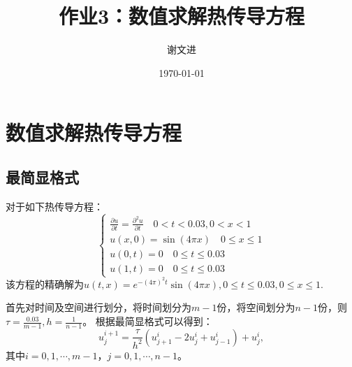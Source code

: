 \documentclass{ctexart}
\title{作业3：数值求解热传导方程}
\author{谢文进}
\date{\today}
\begin{document}
\maketitle
\section{数值求解热传导方程}
\subsection{最简显格式}
对于如下热传导方程：
\begin{equation}
    \begin{cases}
        \frac{\partial u}{\partial t} =\frac{\partial ^2 u}{\partial t}  \quad 0<t<0.03,0<x<1 \\  
        u(x,0)=\sin(4\pi x) \quad 0 \le x \le 1 \\
        u(0,t)  = 0 \quad  0 \le t \le 0.03 \\
        u(1,t)  = 0 \quad 0 \le t \le 0.03
    \end{cases}
\end{equation}
该方程的精确解为$u(t,x)=e^{-(4\pi)^2t}\sin (4 \pi x),0\le t \le 0.03, 0 \le x \le 1.$

首先对时间及空间进行划分，将时间划分为$m-1$份，将空间划分为$n-1$份，则$\tau=\frac{0.03}{m-1},h=\frac{1}{n-1}$。
根据最简显格式可以得到：
\begin{equation}
    u_j^{i+1}=\frac{\tau}{h^2}(u_{j+1}^{i}-2u_j^i+u_{j-1}^i)+u_j^{i},
\end{equation}
其中$i=0,1,\cdots,m-1$，$j=0,1,\cdots,n-1$。
\end{document}
